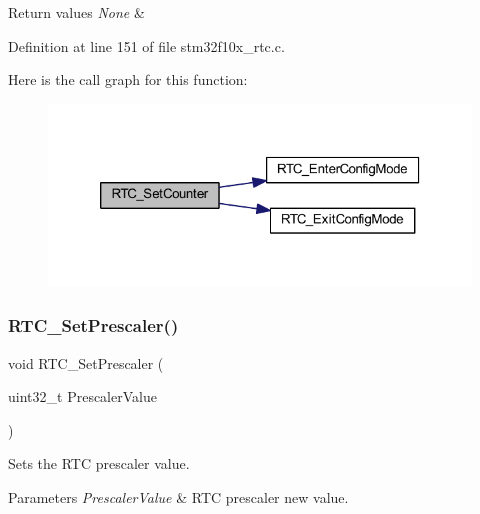 \begin{DoxyRetVals}{Return values}
{\em None} & \\
\hline
\end{DoxyRetVals}


Definition at line 151 of file stm32f10x\+\_\+rtc.\+c.

Here is the call graph for this function\+:
\nopagebreak
\begin{figure}[H]
\begin{center}
\leavevmode
\includegraphics[width=320pt]{group___r_t_c___private___functions_gafa81ec17158de1d1a7740eca81b9fb65_cgraph}
\end{center}
\end{figure}
\mbox{\label{group___r_t_c___private___functions_gaf76be6071d1ba65b009e0791069e602c}} 
\subsubsection{\texorpdfstring{R\+T\+C\+\_\+\+Set\+Prescaler()}{RTC\_SetPrescaler()}}
{\footnotesize\ttfamily void R\+T\+C\+\_\+\+Set\+Prescaler (\begin{DoxyParamCaption}\item[{uint32\+\_\+t}]{Prescaler\+Value }\end{DoxyParamCaption})}



Sets the R\+TC prescaler value. 


\begin{DoxyParams}{Parameters}
{\em Prescaler\+Value} & R\+TC prescaler new value. \\
\hline
\end{DoxyParams}

